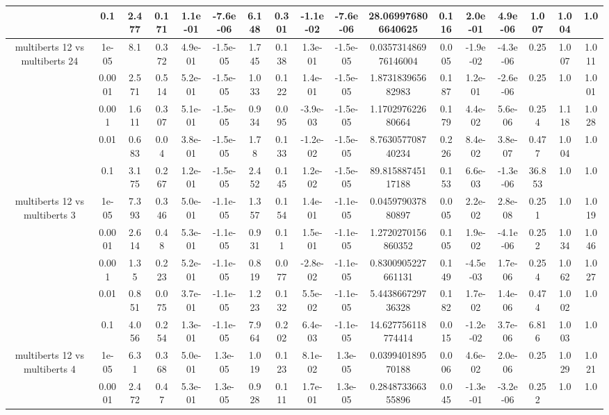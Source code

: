 \begin{tabular}{|c|c|c|c|c|c|c|c|c|c|c|c|c|c|c|c|c|}
 & 0.1 & 2.477 & 0.171 & 1.1e-01 & -7.6e-06 & 6.148 & 0.301 & -1.1e-02 & -7.6e-06 & 28.069976806640625 & 0.116 & 2.0e-01 & 4.9e-06 & 1.007 & 1.004 & 1.0 \\
\hline
\multirow{5}{*}{multiberts 12 vs multiberts 24} & 1e-05 & 8.1 & 0.372 & 4.9e-01 & -1.5e-05 & 1.745 & 0.138 & 1.3e-01 & -1.5e-05 & 0.035731486976146004 & 0.005 & -1.9e-02 & -4.3e-06 & 0.25 & 1.007 & 1.011 \\
 & 0.0001 & 2.571 & 0.514 & 5.2e-01 & -1.5e-05 & 1.033 & 0.122 & 1.4e-01 & -1.5e-05 & 1.873183965682983 & 0.187 & 1.2e-01 & -2.6e-06 & 0.25 & 1.0 & 1.001 \\
 & 0.001 & 1.611 & 0.307 & 5.1e-01 & -1.5e-05 & 0.934 & 0.095 & -3.9e-03 & -1.5e-05 & 1.170297622680664 & 0.179 & 4.4e-02 & 5.6e-06 & 0.254 & 1.118 & 1.028 \\
 & 0.01 & 0.683 & 0.04 & 3.8e-01 & -1.5e-05 & 1.78 & 0.133 & -1.2e-02 & -1.5e-05 & 8.763057708740234 & 0.226 & 8.4e-02 & 3.8e-07 & 0.477 & 1.004 & 1.0 \\
 & 0.1 & 3.175 & 0.267 & 1.2e-01 & -1.5e-05 & 2.452 & 0.145 & 1.2e-02 & -1.5e-05 & 89.81588745117188 & 0.153 & 6.6e-03 & -1.3e-06 & 36.853 & 1.0 & 1.0 \\
\hline
\multirow{5}{*}{multiberts 12 vs multiberts 3} & 1e-05 & 7.393 & 0.346 & 5.0e-01 & -1.1e-05 & 1.357 & 0.154 & 1.4e-01 & -1.1e-05 & 0.045979037880897 & 0.005 & 2.2e-02 & 2.8e-08 & 0.251 & 1.0 & 1.019 \\
 & 0.0001 & 2.614 & 0.48 & 5.3e-01 & -1.1e-05 & 0.931 & 0.11 & 1.5e-01 & -1.1e-05 & 1.2720270156860352 & 0.105 & 1.9e-02 & -4.1e-06 & 0.252 & 1.034 & 1.046 \\
 & 0.001 & 1.35 & 0.223 & 5.2e-01 & -1.1e-05 & 0.819 & 0.077 & -2.8e-02 & -1.1e-05 & 0.8300905227661131 & 0.149 & -4.5e-03 & 1.7e-06 & 0.254 & 1.062 & 1.027 \\
 & 0.01 & 0.851 & 0.075 & 3.7e-01 & -1.1e-05 & 1.223 & 0.132 & 5.5e-02 & -1.1e-05 & 5.443866729736328 & 0.182 & 1.7e-02 & 1.4e-06 & 0.474 & 1.002 & 1.0 \\
 & 0.1 & 4.056 & 0.254 & 1.3e-01 & -1.1e-05 & 7.964 & 0.202 & 6.4e-03 & -1.1e-05 & 14.627756118774414 & 0.015 & -1.2e-02 & 3.7e-06 & 6.816 & 1.003 & 1.0 \\
\hline
\multirow{5}{*}{multiberts 12 vs multiberts 4} & 1e-05 & 6.31 & 0.368 & 5.0e-01 & 1.3e-05 & 1.019 & 0.123 & 8.1e-02 & 1.3e-05 & 0.039940189570188 & 0.006 & 4.6e-02 & 2.0e-06 & 0.25 & 1.029 & 1.021 \\
 & 0.0001 & 2.472 & 0.47 & 5.3e-01 & 1.3e-05 & 0.928 & 0.111 & 1.7e-01 & 1.3e-05 & 0.284873366355896 & 0.045 & -1.3e-01 & -3.2e-06 & 0.252 & 1.0 & 1.0 \\

\end{tabular}

